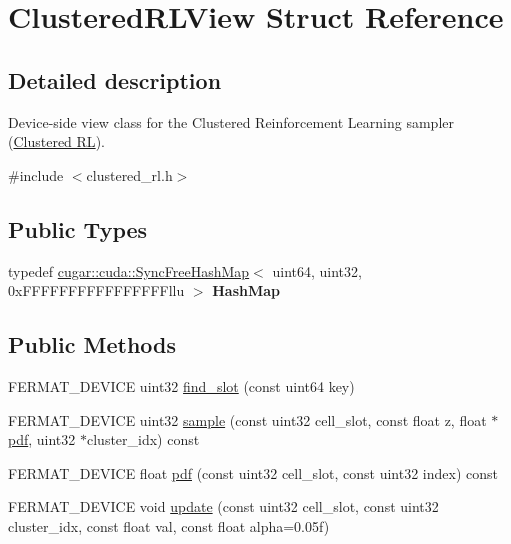 \hypertarget{struct_clustered_r_l_view}{}\section{Clustered\+R\+L\+View Struct Reference}
\label{struct_clustered_r_l_view}


\subsection{Detailed description}
Device-\/side view class for the Clustered Reinforcement Learning sampler (\hyperlink{group___clustered_r_l_module}{Clustered RL}). 

{\ttfamily \#include $<$clustered\+\_\+rl.\+h$>$}

\subsection*{Public Types}
\begin{DoxyCompactItemize}
\item 
\mbox{\label{struct_clustered_r_l_view_a78da128381803af43c08b47b0427cb02}} 
typedef \hyperlink{structcugar_1_1cuda_1_1_sync_free_hash_map}{cugar\+::cuda\+::\+Sync\+Free\+Hash\+Map}$<$ uint64, uint32, 0x\+F\+F\+F\+F\+F\+F\+F\+F\+F\+F\+F\+F\+F\+F\+F\+Fllu $>$ {\bfseries Hash\+Map}
\end{DoxyCompactItemize}
\subsection*{Public Methods}
\begin{DoxyCompactItemize}
\item 
F\+E\+R\+M\+A\+T\+\_\+\+D\+E\+V\+I\+CE uint32 \hyperlink{struct_clustered_r_l_view_ad23add8b87f5755240e40d976f9c8b0d}{find\+\_\+slot} (const uint64 key)
\item 
F\+E\+R\+M\+A\+T\+\_\+\+D\+E\+V\+I\+CE uint32 \hyperlink{struct_clustered_r_l_view_a72030c277568b5f0ee9476ce520e1096}{sample} (const uint32 cell\+\_\+slot, const float z, float $\ast$\hyperlink{struct_clustered_r_l_view_ad2f4d9df7d5b7278462e1f0dbf2386e3}{pdf}, uint32 $\ast$cluster\+\_\+idx) const
\item 
F\+E\+R\+M\+A\+T\+\_\+\+D\+E\+V\+I\+CE float \hyperlink{struct_clustered_r_l_view_ad2f4d9df7d5b7278462e1f0dbf2386e3}{pdf} (const uint32 cell\+\_\+slot, const uint32 index) const
\item 
F\+E\+R\+M\+A\+T\+\_\+\+D\+E\+V\+I\+CE void \hyperlink{struct_clustered_r_l_view_a007fd0458e4dd173adf57dec5f4db9e2}{update} (const uint32 cell\+\_\+slot, const uint32 cluster\+\_\+idx, const float val, const float alpha=0.\+05f)
\end{DoxyCompactItemize}

